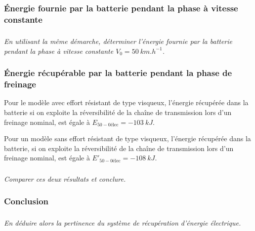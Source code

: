 \documentclass[10pt,fleqn]{article} %
\begin{document}
\begin{multicols}{2}
\subsubsection*{Énergie fournie par la batterie pendant la phase à vitesse constante}


\subparagraph{}\textit{En utilisant la même démarche, déterminer l’énergie fournie par la batterie pendant la phase à vitesse constante $V_0 = \SI{50}{km.h^{-1}}$.}
\ifprof
\begin{corrige}
\end{corrige}
\else
\fi



\subsubsection*{Énergie récupérable par la batterie pendant la phase de freinage}

Pour le modèle avec effort résistant de type visqueux, l’énergie récupérée dans la batterie si on exploite la
réversibilité de la chaîne de transmission lors d’un freinage nominal, est égale à $E_{50-0\text{élec}} = -\SI{103}{kJ}$.

Pour un modèle sans effort résistant de type visqueux, l’énergie récupérée dans la batterie, si on exploite la
réversibilité de la chaîne de transmission lors d’un freinage nominal, est égale à $E'_{50-0\text{élec}} = -\SI{108}{kJ}$.

\subparagraph{}\textit{Comparer ces deux résultats et conclure.}
\ifprof
\begin{corrige}
\end{corrige}
\else
\fi

\subsubsection*{Conclusion}

\subparagraph{}\textit{En déduire alors la pertinence du système de récupération d’énergie électrique.}
\ifprof
\begin{corrige}
\end{corrige}
\else
\fi



\end{multicols}
\end{document}
